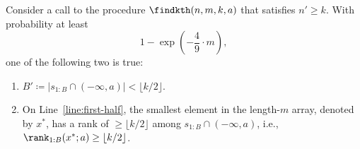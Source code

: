 \begin{lemma}\label{lemma.thm2.1}
    Consider a call to the procedure $\findkth(n, m, k, a)$ that satisfies $n' \ge k$. With probability at least 
    \[
        1- \exp\left(-\frac{4}{9}\cdot m\right),
    \]
    one of the following two is true:
    \begin{enumerate}
        \item $B' \coloneqq |s_{1:B} \cap (-\infty, a)| < \lfloor k / 2\rfloor$.
        \item On Line~\ref{line:first-half}, the smallest element in the length-$m$ array, denoted by $x^*$, has a rank of $\ge \lfloor k/2 \rfloor$ among $s_{1:B} \cap (-\infty, a)$, i.e., $\rank_{1:B}(x^*; a) \ge \lfloor k / 2\rfloor$.
    \end{enumerate}
\end{lemma}

